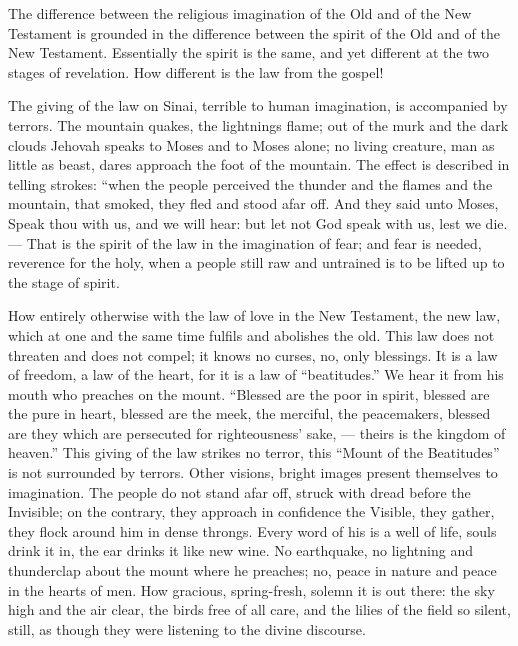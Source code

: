 \documentclass[12pt,a4paper,openany]{book}
\newcommand{\opage}[1]{\marginnote{\footnotesize\textit{[#1]}}}
\begin{document}
The difference between the religious imagination of the Old and of the New Testament
is grounded in the difference
between the spirit of the Old and of the New Testament.
Essentially the spirit is the same, and yet different at the two
stages of revelation. How different is
the law from the gospel!

The giving of the law on Sinai, terrible to human
imagination, is accompanied by terrors. The mountain quakes,
the lightnings flame; out of the murk and the dark clouds
Jehovah speaks to Moses and to Moses alone; no living
creature, man as little as beast, dares approach
the foot of the mountain. The effect is described in telling strokes:
``when the people perceived the thunder and the flames and the mountain,
\setcounter{footnote}{0}%
\opage{59}that smoked, they fled and stood afar off. And they
said unto Moses, Speak thou with us, and we will hear: but
let not God speak with us, lest we die. --- That is
the spirit of the law in the imagination of fear; and fear is needed,
reverence for the holy, when a people still raw and
untrained is to be lifted up to the stage of spirit.

How entirely otherwise with the law of love in
the New Testament, the new law, which at one and the same time
fulfils and abolishes the old. This law does not threaten
and does not compel; it knows no curses,
no, only blessings. It is a law of freedom, a
law of the heart, for it is a law of ``beatitudes.'' We
hear it from his mouth who preaches on the mount.
``Blessed are the poor in spirit, blessed are the pure in heart,
blessed are the meek, the merciful, the peacemakers,
blessed are they which are persecuted for righteousness' sake,
--- theirs is the kingdom of heaven.'' This giving of the law strikes
no terror, this ``Mount of the Beatitudes'' is not
surrounded by terrors. Other visions, bright images present
themselves to imagination. The people do not stand afar off,
struck with dread before the Invisible; on the contrary,
they approach in confidence the Visible, they gather,
they flock around him in dense throngs. Every
word of his is a well of life, souls drink it in, the ear
drinks it like new wine. No earthquake, no
lightning and thunderclap about the mount where he preaches;
no, peace in nature and peace in the hearts of men.
How gracious, spring-fresh, solemn it is out there:
the sky high and the air clear, the birds free of all care,
and the lilies of the field so silent, still, as though
they were listening to the divine discourse.
\end{document}
